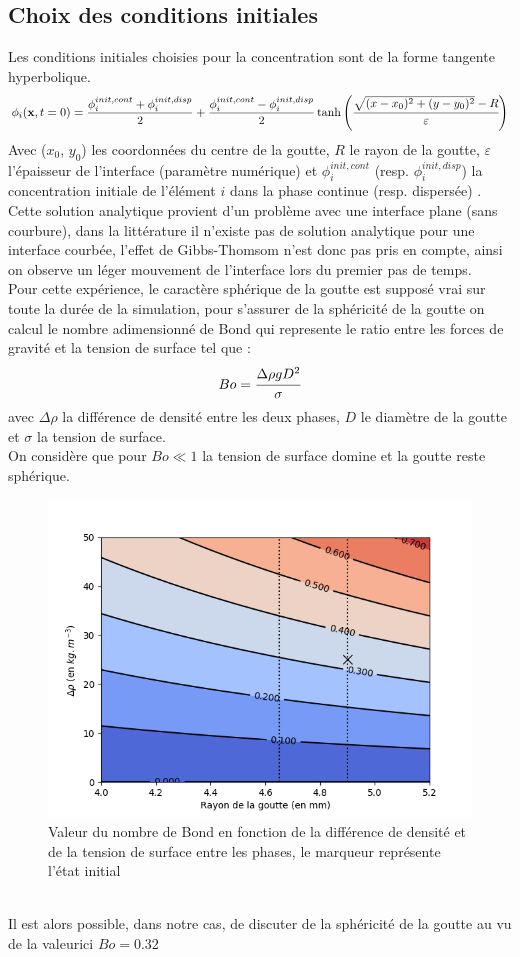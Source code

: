 \documentclass[a4paper,11pt,fleqn]{report}    %
\begin{document}
\subsection{Choix des conditions initiales}
Les conditions initiales choisies pour la concentration sont de la forme tangente hyperbolique.
\begin{equation}
	\phi_{i}(\mathbf{x},t=0) = \frac{\phi^{init,cont}_i + \phi^{init,disp}_i  }{2} +  \frac{\phi^{init,cont}_i - \phi^{init,disp}_i }{2}\tanh\left(\cfrac{\sqrt{(x-x_0)^2+(y-y_0)^2}-R}{\varepsilon} \right)
\end{equation}
Avec ($x_0$, $y_0$) les coordonnées du centre de la goutte, $R$ le rayon de la goutte, $\varepsilon$ l'épaisseur de l'interface (paramètre numérique) et $\phi_i^{init,cont}$ (resp. $\phi_i^{init,disp}$) la concentration initiale de l'élément $i$ dans la phase continue (resp. dispersée) .\\
Cette solution analytique provient d'un problème avec une interface plane (sans courbure), dans la littérature il n'existe pas de solution analytique pour une interface courbée, l'effet de Gibbs-Thomsom n'est donc pas pris en compte, ainsi on observe un léger mouvement de l'interface lors du premier pas de temps. \\
Pour cette expérience, le caractère sphérique de la goutte est supposé vrai sur toute la durée de la simulation, pour s'assurer de la sphéricité de la goutte on calcul le nombre adimensionné de Bond  qui represente le ratio entre les forces de gravité et la tension de surface tel que :
\begin{equation}
	Bo = \cfrac{\Delta \rho g D^2}{\sigma}
\end{equation}
avec $\Delta\rho$ la différence de densité entre les deux phases, $D$ le diamètre de la goutte et $\sigma$ la tension de surface.\\
On considère que pour $Bo \ll 1$ la tension de surface domine et la goutte reste sphérique.
\begin{figure}[h!]
	\centering
	\includegraphics[width=0.7\linewidth]{figure/contour_bond}
	\caption[Valeur du nombre de Bond en fonction de la différence de densité et de la tension de surface entre les phases]{Valeur du nombre de Bond en fonction de la différence de densité et de la tension de surface entre les phases, le marqueur représente l'état initial}
	\label{fig:contourbond}
\end{figure}\\
Il est alors possible, dans notre cas, de discuter de la sphéricité de la goutte au vu de la valeurici $Bo = 0.32$




\newpage
\printbibliography
\end{document}

